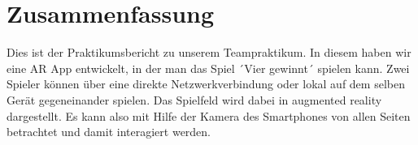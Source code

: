 \section{Zusammenfassung}
Dies ist der Praktikumsbericht zu unserem Teampraktikum. In diesem haben wir
eine AR App entwickelt, in der man das Spiel ´Vier gewinnt´ spielen kann. Zwei Spieler
können über eine direkte Netzwerkverbindung oder lokal auf dem selben Gerät gegeneinander spielen.
Das Spielfeld wird dabei in augmented reality dargestellt. Es kann also mit Hilfe der Kamera
des Smartphones von allen Seiten betrachtet und damit interagiert werden.